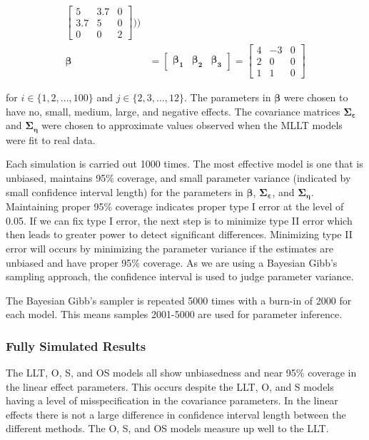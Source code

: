 \documentclass[
]{article}
\begin{document}
\begin{equation*}
\begin{aligned}
\begin{bmatrix}
5 & 3.7 & 0\\
3.7 & 5 & 0\\
0 & 0 & 2
\end{bmatrix})
)\\
\boldsymbol{\beta} &= \begin{bmatrix} \boldsymbol{\beta_1} & \boldsymbol{\beta_2} &  \boldsymbol{\beta_3} \end{bmatrix} = 
\begin{bmatrix}
4 & -3 & 0\\
2 & 0 & 0\\
1 & 1 & 0
\end{bmatrix}
\end{aligned}
\end{equation*}

for \(i \in \{1, 2, ..., 100\}\) and \(j \in \{2, 3,..., 12\}\). The parameters in \(\boldsymbol{\beta}\) were chosen to have no, small, medium, large, and negative effects. The covariance matrices \(\boldsymbol{\Sigma_\varepsilon}\) and \(\boldsymbol{\Sigma_\eta}\) were chosen to approximate values observed when the MLLT models were fit to real data.

Each simulation is carried out 1000 times. The most effective model is one that is unbiased, maintains 95\% coverage, and small parameter variance (indicated by small confidence interval length) for the parameters in \(\boldsymbol{\beta}\), \(\boldsymbol{\Sigma_\varepsilon}\), and \(\boldsymbol{\Sigma_\eta}\). Maintaining proper 95\% coverage indicates proper type I error at the level of 0.05. If we can fix type I error, the next step is to minimize type II error which then leads to greater power to detect significant differences. Minimizing type II error will occurs by minimizing the parameter variance if the estimates are unbiased and have proper 95\% coverage. As we are using a Bayesian Gibb's sampling approach, the confidence interval is used to judge parameter variance.

The Bayesian Gibb's sampler is repeated 5000 times with a burn-in of 2000 for each model. This means samples 2001-5000 are used for parameter inference.

\hypertarget{fully-simulated-results}{%
\subsubsection{Fully Simulated Results}\label{fully-simulated-results}}

The LLT, O, S, and OS models all show unbiasedness and near 95\% coverage in the linear effect parameters. This occurs despite the LLT, O, and S models having a level of misspecification in the covariance parameters. In the linear effects there is not a large difference in confidence interval length between the different methods. The O, S, and OS models measure up well to the LLT.
\end{document}
